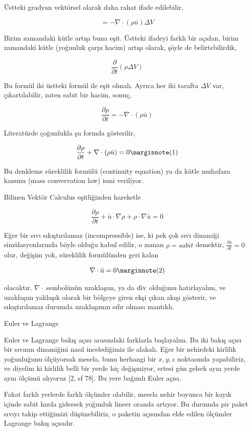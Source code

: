 \documentclass[12pt,fleqn]{article}\usepackage{../../common}
\begin{document}
Üstteki gradyan vektörsel olarak daha rahat ifade edilebilir,

$$
= -\nabla \cdot (\rho \bar{u} ) \Delta V
$$

Birim zamandaki kütle artışı buna eşit. Üstteki ifadeyi farklı bir açıdan, birim
zamandaki kütle (yoğunluk çarpı hacim) artışı olarak, şöyle de belirtebilirdik,

$$
\frac{\partial }{\partial t} (\rho \Delta V) 
$$

Bu formül iki üstteki formül ile eşit olmalı. Ayrıca her iki tarafta $\Delta V$
var, çıkartılabilir, zaten sabit bir hacim, sonuç,

$$
\frac{\partial \rho}{\partial t}  = -\nabla \cdot (\rho \bar{u} )
$$

Literatürde çoğunlukla şu formda gösterilir,

$$
\frac{\partial \rho}{\partial t}  + \nabla \cdot (\rho \bar{u} ) = 0
\mlabel{1}
$$

Bu denkleme süreklilik formülü (continuity equation) ya da kütle muhafaza kanunu
(mass convervation law) ismi veriliyor.

Bilinen Vektör Calculus eşitliğinden hareketle

$$
\frac{\partial \rho}{\partial t}  +
\bar{u} \cdot \nabla \rho +
\rho \cdot \nabla \bar{u} = 0
$$

Eğer bir sıvı sıkıştırılamaz (incompressible) ise, ki pek çok sıvı dinamiği
simülasyonlarında böyle olduğu kabul edilir, o zaman $\rho = sabit$ demektir,
$\frac{\partial \rho}{\partial t} = 0 $ olur, değişim yok, süreklilik
formülünden geri kalan

$$
\nabla \cdot \bar{u} = 0
\mlabel{2}
$$

olacaktır. $\nabla \cdot$ sembolünün uzaklaşım, ya da $\operatorname{div}$ olduğunu
hatırlayalım, ve uzaklaşım yaklaşık olarak bir bölgeye giren ekşi çıkan akışı
gösterir, ve sıkıştırılamaz durumda uzaklaşımın sıfır olması mantıklı.

Euler ve Lagrange

Euler ve Lagrange bakış açısı arasındaki farklarla başlayalım. Bu iki bakış
açısı bir sıvının dinamiğini nasıl incelediğimiz ile alakalı. Eğer bir nehirdeki
kirlilik yoğunluğunu ölçüyorsak mesela, bunu herhangi bir $x,y,z$ noktasında
yapabiliriz, ve diyelim ki kirlilik belli bir yerde hiç değişmiyor, ertesi gün
gelsek aynı yerde aynı ölçümü alıyoruz [2, sf 78]. Bu yere bağımlı Euler açısı.

Fakat farklı yerlerde farklı ölçümler olabilir, mesela nehir boyunca bir kayık
içinde sabit hızda gidersek yoğunluk lineer oranda artıyor. Bu durumda pir paket
sıvıyı takip ettiğimizi düşünebiliriz, o paketin açısından elde edilen ölçümler
Lagrange bakış açısıdır. 
\end{document}
